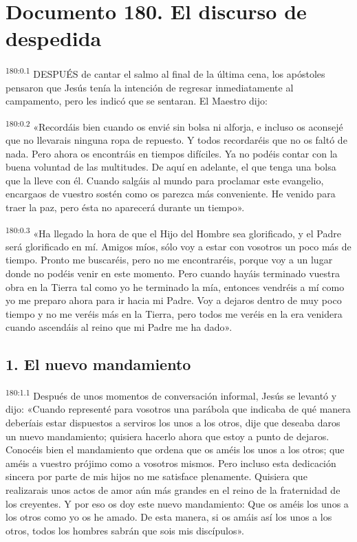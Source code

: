 \chapter{Documento 180. El discurso de despedida}
\par 
\textsuperscript{180:0.1} DESPUÉS de cantar el salmo al final de la última cena, los apóstoles pensaron que Jesús tenía la intención de regresar inmediatamente al campamento, pero les indicó que se sentaran. El Maestro dijo:

\par 
\textsuperscript{180:0.2} «Recordáis bien cuando os envié sin bolsa ni alforja, e incluso os aconsejé que no llevarais ninguna ropa de repuesto. Y todos recordaréis que no os faltó de nada. Pero ahora os encontráis en tiempos difíciles. Ya no podéis contar con la buena voluntad de las multitudes. De aquí en adelante, el que tenga una bolsa que la lleve con él. Cuando salgáis al mundo para proclamar este evangelio, encargaos de vuestro sostén como os parezca más conveniente. He venido para traer la paz, pero ésta no aparecerá durante un tiempo».

\par 
\textsuperscript{180:0.3} «Ha llegado la hora de que el Hijo del Hombre sea glorificado, y el Padre será glorificado en mí. Amigos míos, sólo voy a estar con vosotros un poco más de tiempo. Pronto me buscaréis, pero no me encontraréis, porque voy a un lugar donde no podéis venir en este momento. Pero cuando hayáis terminado vuestra obra en la Tierra tal como yo he terminado la mía, entonces vendréis a mí como yo me preparo ahora para ir hacia mi Padre. Voy a dejaros dentro de muy poco tiempo y no me veréis más en la Tierra, pero todos me veréis en la era venidera cuando ascendáis al reino que mi Padre me ha dado».

\section*{1. El nuevo mandamiento}
\par 
\textsuperscript{180:1.1} Después de unos momentos de conversación informal, Jesús se levantó y dijo: «Cuando representé para vosotros una parábola que indicaba de qué manera deberíais estar dispuestos a serviros los unos a los otros, dije que deseaba daros un nuevo mandamiento; quisiera hacerlo ahora que estoy a punto de dejaros. Conocéis bien el mandamiento que ordena que os améis los unos a los otros; que améis a vuestro prójimo como a vosotros mismos. Pero incluso esta dedicación sincera por parte de mis hijos no me satisface plenamente. Quisiera que realizarais unos actos de amor aún más grandes en el reino de la fraternidad de los creyentes. Y por eso os doy este nuevo mandamiento: Que os améis los unos a los otros como yo os he amado. De esta manera, si os amáis así los unos a los otros, todos los hombres sabrán que sois mis discípulos».


